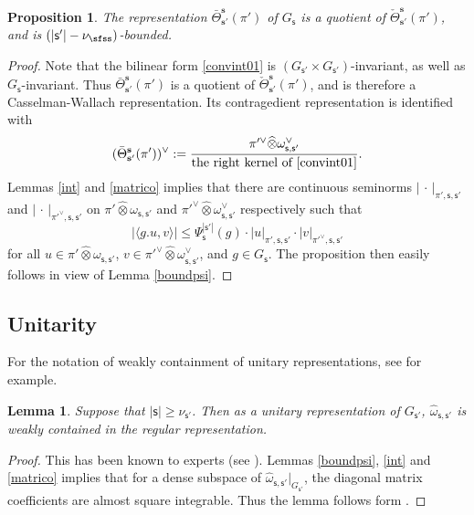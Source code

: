 \documentclass[12pt,a4paper]{amsart}
\def\abs#1{\left|{#1}\right|}
\newcommand{\la}{\langle}
\newcommand{\ra}{\rangle}
\numberwithin{equation}{section}
\newtheorem{lem}[thm]{Lemma}
\newtheorem{prop}[thm]{Proposition}
\theoremstyle{remark}
\def\Thetab{\bar{\Theta}}
\begin{document}
\begin{prop}\label{boundm}
The representation $\Thetab_{\mathbf s'}^{\mathbf s}(\pi')$ of $G_{\mathsf s}$ is a quotient of  $\check \Theta_{\mathbf s'}^{\mathbf s}(\pi')$, and is  $(\abs{\mathsf s'}-\nu_\sfss)$-bounded.
\end{prop}
\begin{proof}
Note that the bilinear form \eqref{convint01} is  $(G_{\mathsf s'}\times G_{\mathsf s'})$-invariant, as well as $G_{\mathsf s}$-invariant. Thus $\Thetab_{\mathbf s'}^{\mathbf s}(\pi')$ is a quotient of  $\check \Theta_{\mathbf s'}^{\mathbf s}(\pi')$, and is therefore a Casselman-Wallach representation. Its contragedient representation 
is identified with 
\[
(\Thetab_{\mathbf s'}^{\mathbf s}(\pi'))^\vee:=\frac{\pi'^\vee \widehat \otimes \omega^\vee_{\mathsf s, \mathsf s'}}{\textrm{the right kernel of \eqref{convint01}}}.
\]
 Lemmas \ref{int} and \ref{matrico} implies that there are continuous seminorms $\abs{\,\cdot\,}_{\pi', \mathsf s, \mathsf s'}$ and $\abs{\,\cdot\,}_{\pi'^\vee, \mathsf s, \mathsf s'}$ on  $\pi' \widehat \otimes \omega_{\mathsf s, \mathsf s'}$ and $\pi'^\vee \widehat \otimes \omega^\vee_{\mathsf s, \mathsf s'}$ respectively such that 
\[
 \abs{ \la g. u, v\ra}\leq \Psi_{\mathsf s}^{\abs{\mathsf s'}}(g)\cdot \abs{u}_{\pi', \mathsf s, \mathsf s'}\cdot \abs{v}_{\pi'^\vee, \mathsf s, \mathsf s'}
\]
for all $u\in \pi' \widehat \otimes \omega_{\mathsf s, \mathsf s'}$, $v\in \pi'^\vee \widehat \otimes \omega^\vee_{\mathsf s, \mathsf s'}$, and $g\in G_{\mathsf s}$. 
The proposition  then easily follows in view of  Lemma \ref{boundpsi}. 
 \end{proof}







\subsection{Unitarity}

For the notation of weakly containment of unitary representations, see \cite{CHH} for example.  

\begin{lem}\label{weaklycont}
Suppose that $\abs{\mathsf s}\geq  \nu_{\mathsf s'}$. Then as a unitary representation of $G_{\mathsf s'}$, $\hat \omega_{\mathsf s, \mathsf s'}$ is weakly  contained 
in the regular representation. 
\end{lem}
\begin{proof}
This has been known to experts (see   \cite[Theorem 3.2]{Li89}).  Lemmas \ref{boundpsi}, \ref{int} and \ref{matrico} implies that for a dense subspace of $\hat \omega_{\mathsf s, \mathsf s'}|_{G_{\mathsf s'}}$, the diagonal  matrix coefficients are almost square integrable. 
 Thus the lemma follows form \cite[Theorem 1]{CHH}.  
\end{proof}
\end{document}
